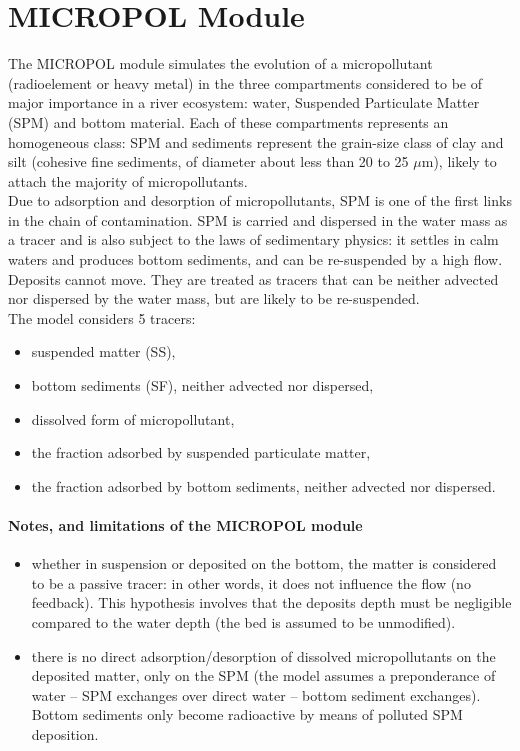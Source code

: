 \chapter{MICROPOL Module}

The MICROPOL module simulates the evolution of a micropollutant (radioelement or heavy metal)
in the three compartments considered to be of major importance in a river ecosystem:
water, Suspended Particulate Matter (SPM) and bottom material.
Each of these compartments represents an homogeneous class:
SPM and sediments represent the grain-size class of clay and silt
(cohesive fine sediments, of diameter about less than 20 to 25 $\mu$m),
likely to attach the majority of micropollutants.\\

Due to adsorption and desorption of micropollutants,
SPM is one of the first links in the chain of contamination.
SPM is carried and dispersed in the water mass
as a tracer and is also subject to the laws of sedimentary physics:
it settles in calm waters and produces bottom sediments,
and can be re-suspended by a high flow.
Deposits cannot move. They are treated as tracers that can be neither advected
nor dispersed by the water mass, but are likely to be re-suspended.\\

The model considers 5 tracers:

\begin{itemize}
\item suspended matter (SS),
\item bottom sediments (SF), neither advected nor dispersed,
\item dissolved form of micropollutant,
\item the fraction adsorbed by suspended particulate matter,
\item the fraction adsorbed by bottom sediments, neither advected nor dispersed.
\end{itemize}

\subsubsection{Notes, and limitations of the MICROPOL module}

\begin{itemize}
\item whether in suspension or deposited on the bottom, the matter is considered
  to be a passive tracer:
  in other words, it does not influence the flow (no feedback).
  This hypothesis involves that the deposits depth must be negligible compared
  to the water depth (the bed is assumed to be unmodified).
\item there is no direct adsorption/desorption of dissolved micropollutants
  on the deposited matter, only on the SPM
  (the model assumes a preponderance of water – SPM exchanges over direct water
  – bottom sediment exchanges).
  Bottom sediments only become radioactive by means of polluted SPM deposition. 
\end{itemize}

